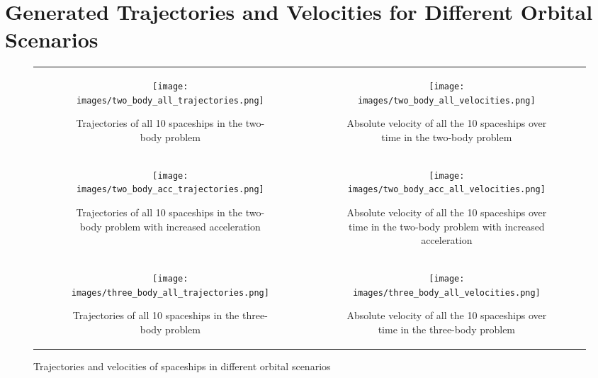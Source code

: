 \documentclass[11pt,a4paper, twocolumn]{article}
\begin{document}
\section{Generated Trajectories and Velocities for Different Orbital Scenarios}
\label{sec:appendix_data_generation}
\begin{figure}[H]
  \centering
  \begin{tabular}{cc}
      \begin{subfigure}[b]{0.45\textwidth}
          \centering
          \texttt{[image: images/two\_body\_all\_trajectories.png]}
          \caption{Trajectories of all 10 spaceships in the two-body problem}
          \label{fig:two_body_trajectory}
      \end{subfigure} &
      \begin{subfigure}[b]{0.45\textwidth}
          \centering
          \texttt{[image: images/two\_body\_all\_velocities.png]}
          \caption{Absolute velocity of all the 10 spaceships over time in the two-body problem}
          \label{fig:two_body_velocity}
      \end{subfigure} \\
      \begin{subfigure}[b]{0.45\textwidth}
          \centering
          \texttt{[image: images/two\_body\_acc\_trajectories.png]}
          \caption{Trajectories of all 10 spaceships in the two-body problem with increased acceleration}
          \label{fig:two_body_acceleration_trajectory}
      \end{subfigure} &
      \begin{subfigure}[b]{0.45\textwidth}
          \centering
          \texttt{[image: images/two\_body\_acc\_all\_velocities.png]}
          \caption{Absolute velocity of all the 10 spaceships over time in the two-body problem with increased acceleration}
          \label{fig:two_body_acceleration_velocity}
      \end{subfigure} \\
      \begin{subfigure}[b]{0.45\textwidth}
          \centering
          \texttt{[image: images/three\_body\_all\_trajectories.png]}
          \caption{Trajectories of all 10 spaceships in the three-body problem}
          \label{fig:three_body_trajectory}
      \end{subfigure} &
      \begin{subfigure}[b]{0.45\textwidth}
          \centering
          \texttt{[image: images/three\_body\_all\_velocities.png]}
          \caption{Absolute velocity of all the 10 spaceships over time in the three-body problem}
          \label{fig:three_body_velocity}
      \end{subfigure}
  \end{tabular}
  \caption{Trajectories and velocities of spaceships in different orbital scenarios}
  \label{fig:data_generation_simulation}
\end{figure}
\end{document}
